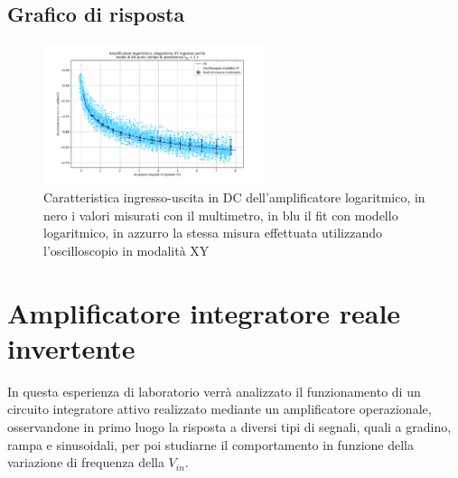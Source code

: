 \documentclass[journal]{IEEEtran}
\begin{document}
\subsection{Grafico di risposta}

\begin{figure}[H]%
\begin {center}
\includegraphics[trim = {100px 0 0 0}, width=0.58\textwidth]{analysis/output/OPA-log-fitted.pdf}
\caption{Caratteristica ingresso-uscita in DC dell'amplificatore logaritmico, in nero i valori misurati con il multimetro, in blu il fit con modello logaritmico, in azzurro la stessa misura effettuata utilizzando l'oscilloscopio in modalità XY}
\label{fig:OPA-integ-res}
\end {center}
\end{figure}


\section{Amplificatore integratore reale invertente} %
In questa esperienza di laboratorio verrà analizzato il funzionamento di un circuito integratore attivo realizzato mediante un amplificatore operazionale, osservandone in primo luogo la risposta a diversi tipi di segnali, quali a gradino, rampa e sinusoidali, per poi studiarne il comportamento in funzione della variazione di frequenza della $V_{in}$.
\end{document}
